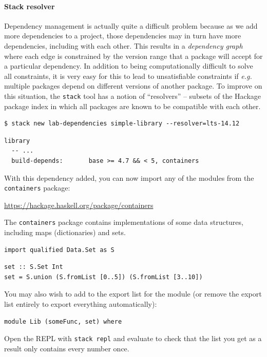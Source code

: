 \paragraph{Stack resolver} Dependency management is actually quite a difficult problem because as we add more dependencies to a project, those dependencies may in turn have more dependencies, including with each other. This results in a \emph{dependency graph} where each edge is constrained by the version range that a package will accept for a particular dependency. In addition to being computationally difficult to solve all constraints, it is very easy for this to lead to unsatisfiable constraints if \emph{e.g.} multiple packages depend on different versions of another package. To improve on this situation, the \texttt{\small stack} tool has a notion of ``resolvers'' -- subsets of the Hackage package index in which all packages are known to be compatible with each other.

\taskLine 

\begin{verbatim}
$ stack new lab-dependencies simple-library --resolver=lts-14.12
\end{verbatim}

\begin{verbatim}
library
  -- ...
  build-depends:       base >= 4.7 && < 5, containers
\end{verbatim}
With this dependency added, you can now import any of the modules from the \texttt{\small containers} package:
\begin{center}\small
	\url{https://hackage.haskell.org/package/containers}
\end{center}
The \texttt{\small containers} package contains implementations of some data structures, including maps (dictionaries) and sets.

\begin{verbatim}
import qualified Data.Set as S
\end{verbatim}

\begin{verbatim}
set :: S.Set Int 
set = S.union (S.fromList [0..5]) (S.fromList [3..10])
\end{verbatim}
You may also wish to add  to the export list for the module (or remove the export list entirely to export everything automatically):
\begin{verbatim}
module Lib (someFunc, set) where 
\end{verbatim}
Open the REPL with \texttt{\small stack repl} and evaluate  to check that the list you get as a result only contains every number once.